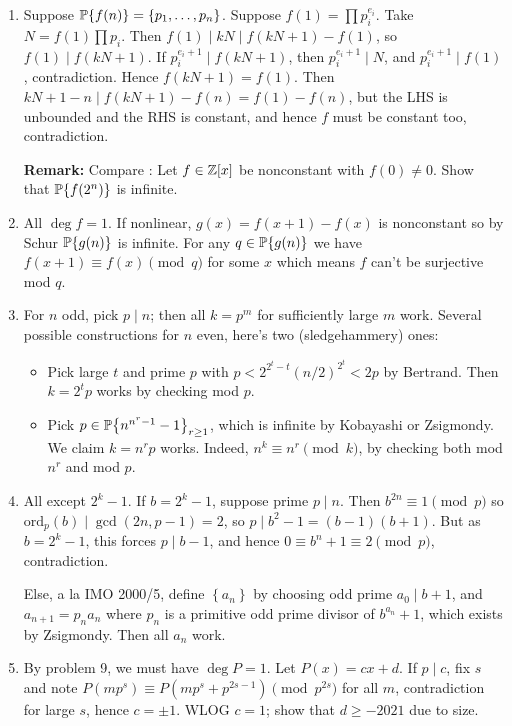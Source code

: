 \documentclass[11pt,paper=letter]{scrartcl}
\newcommand{\seq}[1]{\left\{#1\right\}}
\newcommand{\primeseq}[1]{\PP\!\seq{#1}}
\begin{document}
\begin{enumerate}
\item Suppose $\primeseq{f(n)} = \{p_1, \ldots, p_n\}$. Suppose $f(1) = \prod p_i^{e_i}$. Take $N = f(1)\prod p_i$. Then $f(1) \mid kN \mid f(kN + 1) - f(1)$, so $f(1) \mid f(kN + 1)$. If $p_i^{e_i + 1} \mid f(kN + 1)$, then $p_i^{e_i + 1} \mid N$, and $p_i^{e_i + 1} \mid f(1)$, contradiction. Hence $f(kN + 1) = f(1)$. Then $kN + 1 - n \mid f(kN + 1) - f(n) = f(1) - f(n)$, but the LHS is unbounded and the RHS is constant, and hence $f$ must be constant too, contradiction.

\textbf{Remark:} Compare \href{https://artofproblemsolving.com/community/c6h1841700p12378521}{}: Let $f \in \mathbb Z[x]$ be nonconstant with $f(0) \ne 0$. Show that $\primeseq{f(2^n)}$ is infinite.

\item All $\deg f = 1$. If nonlinear, $g(x) = f(x + 1) - f(x)$ is nonconstant so by Schur $\primeseq{g(n)}$ is infinite. For any $q \in \primeseq{g(n)}$ we have $f(x + 1) \equiv f(x) \pmod q$ for some $x$ which means $f$ can't be surjective mod $q$.

\item For $n$ odd, pick $p \mid n$; then all $k = p^m$ for sufficiently large $m$ work. Several possible constructions for $n$ even, here's two (sledgehammery) ones:
\begin{itemize}
\item Pick large $t$ and prime $p$ with $p < 2^{2^t - t}(n/2)^{2^t} < 2p$ by Bertrand. Then $k = 2^tp$ works by checking mod $p$.
\item Pick $p \in \primeseq{n^{n^r-1}-1}_{r \ge 1}$, which is infinite by Kobayashi or Zsigmondy. We claim $k = n^rp$ works. Indeed, $n^k \equiv n^r \pmod{k}$, by checking both mod $n^r$ and mod $p$.
\end{itemize}

\item All except $2^k - 1$. If $b = 2^k - 1$, suppose prime $p \mid n$. Then $b^{2n} \equiv 1 \pmod{p}$ so $\mathrm{ord}_p(b) \mid \gcd(2n, p - 1) = 2$, so $p \mid b^2 - 1 = (b - 1)(b + 1)$. But as $b = 2^k - 1$, this forces $p \mid b - 1$, and hence $0 \equiv b^n + 1 \equiv 2 \pmod p$, contradiction.

Else, a la IMO 2000/5, define $\seq{a_n}$ by choosing odd prime $a_0 \mid b + 1$, and $a_{n + 1} = p_na_n$ where $p_n$ is a primitive odd prime divisor of $b^{a_n} + 1$, which exists by Zsigmondy. Then all $a_n$ work.

\item By problem 9, we must have $\deg P = 1$. Let $P(x) = cx + d$. If $p \mid c$, fix $s$ and note $P(mp^s) \equiv P(mp^s + p^{2s-1}) \pmod{p^{2s}}$ for all $m$, contradiction for large $s$, hence $c = \pm1$. WLOG $c = 1$; show that $d \ge -2021$ due to size.


\end{enumerate}
\end{document}
